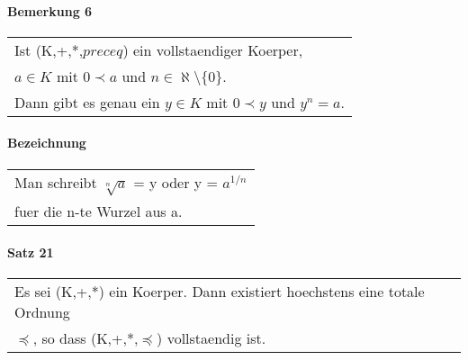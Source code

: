 \documentclass{scrartcl}
\begin{document}
\paragraph{Bemerkung 6}
\begin{tabbing}
\begin{tabular}{l}
Ist (K,+,*,$preceq$) ein vollstaendiger Koerper,\\
$a \in K $ mit $0 \prec a$ und $n \in \aleph \setminus \{ 0\}$.\\
Dann gibt es genau ein $y \in K$ mit $0\prec y$ und $y^n = a$.
\end{tabular}
\end{tabbing}

\paragraph{Bezeichnung}
\begin{tabbing}
\begin{tabular}{l}
Man schreibt $ \sqrt[n]{a}$ = y oder y = $a^{1/n}$\\
fuer die n-te Wurzel aus a.
\end{tabular}
\end{tabbing}

\paragraph{Satz 21}
\begin{tabbing}
\begin{tabular}{l}
Es sei (K,+,*) ein Koerper. Dann existiert hoechstens eine totale Ordnung\\
$\preceq$, so dass (K,+,*,$\preceq$) vollstaendig ist. 
\end{tabular}
\end{tabbing}
\end{document}
